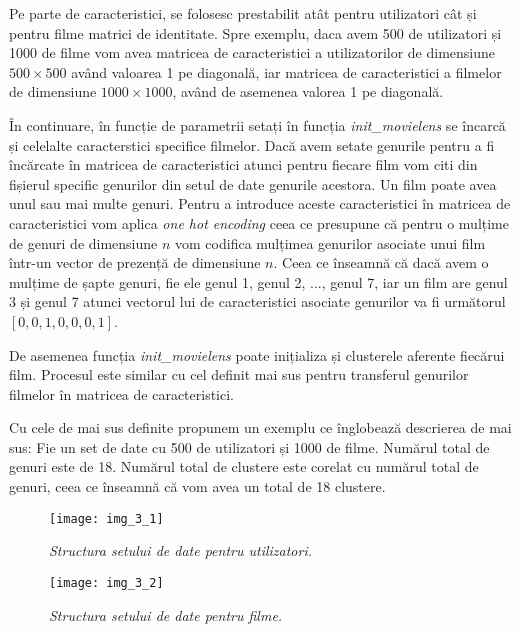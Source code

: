 Pe parte de caracteristici, se folosesc prestabilit atât pentru utilizatori cât și pentru filme matrici de identitate. Spre exemplu, daca avem 500 de utilizatori și 1000 de filme vom avea matricea de caracteristici a utilizatorilor de dimensiune $500 \times 500$ având valoarea 1 pe diagonală, iar matricea de caracteristici a filmelor de dimensiune $1000 \times 1000$, având de asemenea valorea 1 pe diagonală.

În continuare, în funcție de parametrii setați în funcția \textit{init\_movielens} se încarcă și celelalte caracterstici specifice filmelor. Dacă avem setate genurile pentru a fi încărcate în matricea de caracteristici atunci pentru fiecare film vom citi din fișierul specific genurilor din setul de date genurile acestora. Un film poate avea unul sau mai multe genuri. Pentru a introduce aceste caracteristici în matricea de caracteristici vom aplica \textit{one hot encoding} ceea ce presupune că pentru o mulțime de genuri de dimensiune $n$ vom codifica mulțimea genurilor asociate unui film într-un vector de prezență de dimensiune $n$. Ceea ce înseamnă că dacă avem o mulțime de șapte genuri, fie ele genul 1, genul 2, ..., genul 7, iar un film are genul 3 și genul 7 atunci vectorul lui de caracteristici asociate genurilor va fi următorul $[0, 0, 1, 0, 0, 0, 1]$.

De asemenea funcția \textit{init\_movielens} poate inițializa și clusterele aferente fiecărui film. Procesul este similar cu cel definit mai sus pentru transferul genurilor filmelor în matricea de caracteristici.

Cu cele de mai sus definite propunem un exemplu ce înglobează descrierea de mai sus:
Fie un set de date cu 500 de utilizatori și 1000 de filme. Numărul total de genuri este de 18. Numărul total de clustere este corelat cu numărul total de genuri, ceea ce înseamnă că vom avea un total de 18 clustere.
\begin{figure}[!h]
	\centering
	\texttt{[image: img\_3\_1]}
	\caption[Structura setului de date pentru utilizatori]{\textit{Structura setului de date pentru utilizatori.}}
\end{figure} 

\begin{figure}[!h]
	\centering
	\texttt{[image: img\_3\_2]}
	\caption[Structura setului de date pentru filme]{\textit{Structura setului de date pentru filme.}}
\end{figure} 

